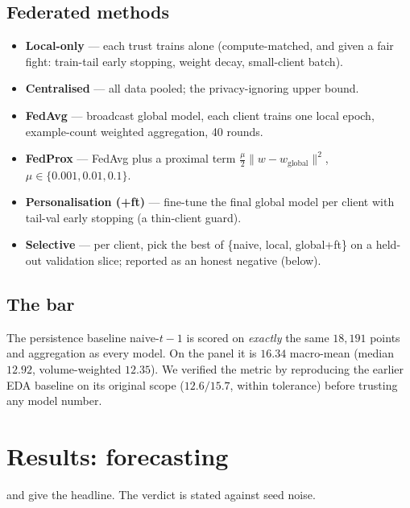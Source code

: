 \documentclass[11pt,a4paper]{article}
\begin{document}
\subsection{Federated methods}
\begin{itemize}[nosep]
  \item \textbf{Local-only} --- each trust trains alone (compute-matched, and given a fair fight:
        train-tail early stopping, weight decay, small-client batch).
  \item \textbf{Centralised} --- all data pooled; the privacy-ignoring upper bound.
  \item \textbf{FedAvg} --- broadcast global model, each client trains one local epoch, example-count
        weighted aggregation, 40 rounds.
  \item \textbf{FedProx} --- FedAvg plus a proximal term $\tfrac{\mu}{2}\lVert w-w_{\text{global}}\rVert^2$,
        $\mu\in\{0.001,0.01,0.1\}$.
  \item \textbf{Personalisation (+ft)} --- fine-tune the final global model per client with tail-val
        early stopping (a thin-client guard).
  \item \textbf{Selective} --- per client, pick the best of \{naive, local, global+ft\} on a held-out
        validation slice; reported as an honest negative (below).
\end{itemize}

\subsection{The bar}
The persistence baseline naive-$t{-}1$ is scored on \emph{exactly} the same $18{,}191$ points and
aggregation as every model. On the panel it is $16.34$ macro-mean (median $12.92$, volume-weighted
$12.35$). We verified the metric by reproducing the earlier EDA baseline on its original scope
($12.6/15.7$, within tolerance) before trusting any model number.

\section{Results: forecasting}\label{sec:results}
 and  give the headline. The verdict is stated against seed noise.
\end{document}
